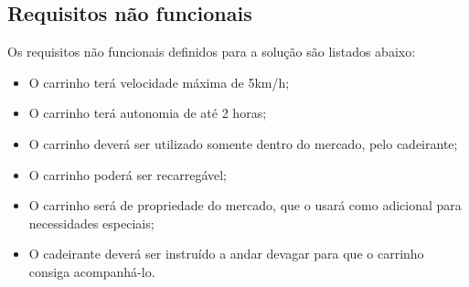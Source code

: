 \begin{table}[h]
{\begin{tabular}{ l l l l }
 \end{tabular} }
\end{table}


\subsection{Requisitos não funcionais}

Os requisitos não funcionais definidos para a solução são listados abaixo:

\begin{itemize}
\item O carrinho terá velocidade máxima de 5km/h;
\item O carrinho terá autonomia de até 2 horas;
\item O carrinho deverá ser utilizado somente dentro do mercado, pelo cadeirante;
\item O carrinho poderá ser recarregável;
\item O carrinho será de propriedade do mercado, que o usará como adicional para necessidades especiais;
\item O cadeirante deverá ser instruído a andar devagar para que o carrinho consiga acompanhá-lo.
\end{itemize}




